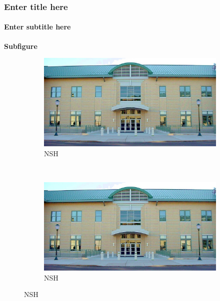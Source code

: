 \documentclass[11pt]{beamer}
\begin{document}
\begin{frame}
\frametitle{Enter title here}
\framesubtitle{Enter subtitle here}

\textbf{Subfigure} \\

\begin{figure}[t!]
    \centering
    \begin{subfigure}[t]{0.5\textwidth}
        \centering
        \includegraphics[scale=.1]{images/nsh.jpg}
        \caption{NSH}
        \label{caption1}
    \end{subfigure}%
    ~
    \begin{subfigure}[t]{0.5\textwidth}
        \centering
        \includegraphics[scale=.1]{images/nsh.jpg}
        \caption{NSH}
        \label{caption2}
    \end{subfigure}%
    

\end{figure}
\end{frame}
\end{document}
